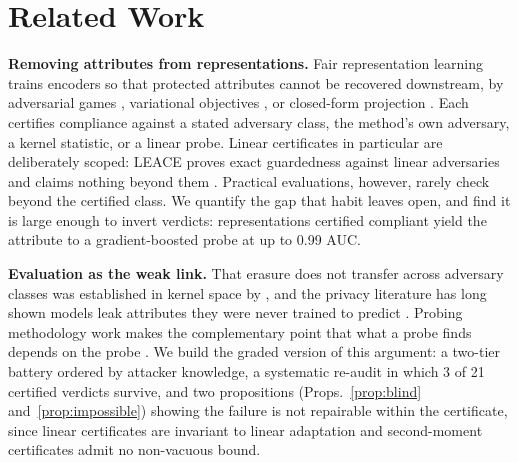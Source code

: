 \documentclass[letterpaper]{article} %
\begin{document}
\section{Related Work}
\textbf{Removing attributes from representations.}
Fair representation learning trains encoders so that protected attributes cannot
be recovered downstream, by adversarial games \citep{madras2018laftr,
ganin2015dann}, variational objectives \citep{louizos2016vfae}, or closed-form
projection \citep{belrose2023leace}. Each certifies compliance against a stated
adversary class, the method's own adversary, a kernel statistic, or a linear
probe. Linear certificates in particular are deliberately scoped: LEACE proves
exact guardedness against linear adversaries and claims nothing beyond them
\citep{belrose2023leace}. Practical evaluations, however, rarely check beyond
the certified class. We quantify the gap that habit leaves open, and find it is
large enough to invert verdicts: representations certified compliant yield the
attribute to a gradient-boosted probe at up to 0.99 AUC.

\textbf{Evaluation as the weak link.}
That erasure does not transfer across adversary classes was established in
kernel space by \citet{ravfogel2022kernelized}, and the privacy literature has
long shown models leak attributes they were never trained to predict
\citep{song2020overlearning}. Probing methodology work makes the complementary
point that what a probe finds depends on the probe
\citep{voita2020mdl,elazar2021amnesic}. We build the graded version of this
argument: a two-tier battery ordered by attacker knowledge, a systematic
re-audit in which 3 of 21 certified verdicts survive, and two propositions
(Props.~\ref{prop:blind} and~\ref{prop:impossible}) showing the failure is not
repairable within the certificate, since linear certificates are invariant to
linear adaptation and second-moment certificates admit no non-vacuous bound.
\end{document}
